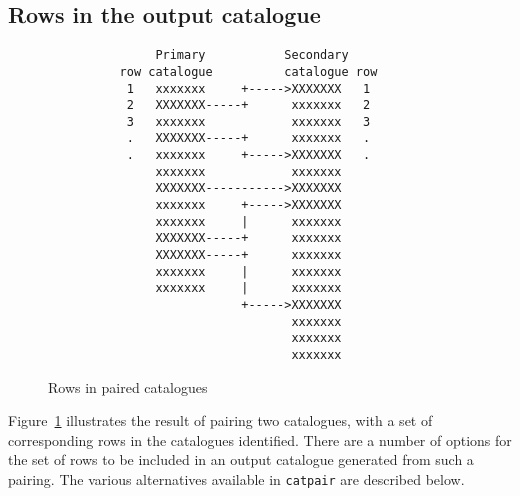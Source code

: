 \documentclass[twoside,11pt]{article}
\renewcommand{\_}{\texttt{\symbol{95}}}
\begin{document}
\subsection{\label{PAIR_PRTYP}Rows in the output catalogue}

\begin{figure}[htbp]

\begin{verbatim}
               Primary           Secondary
          row catalogue          catalogue row
           1   xxxxxxx     +----->XXXXXXX   1
           2   XXXXXXX-----+      xxxxxxx   2
           3   xxxxxxx            xxxxxxx   3
           .   XXXXXXX-----+      xxxxxxx   .
           .   xxxxxxx     +----->XXXXXXX   .
               xxxxxxx            xxxxxxx
               XXXXXXX----------->XXXXXXX
               xxxxxxx     +----->XXXXXXX
               xxxxxxx     |      xxxxxxx
               XXXXXXX-----+      xxxxxxx
               XXXXXXX-----+      xxxxxxx
               xxxxxxx     |      xxxxxxx
               xxxxxxx     |      xxxxxxx
                           +----->XXXXXXX
                                  xxxxxxx
                                  xxxxxxx
                                  xxxxxxx
\end{verbatim}

\caption{Rows in paired catalogues \label{PAIR_JOINED_CAT} }

\end{figure}

Figure~\ref{PAIR_JOINED_CAT} illustrates the result of pairing two catalogues, 
with a set of corresponding rows in the catalogues identified. There are a 
number of options for the set of rows to be included in an output catalogue
generated from such a pairing. The various alternatives available in
{\tt catpair} are described below.
\end{document}
